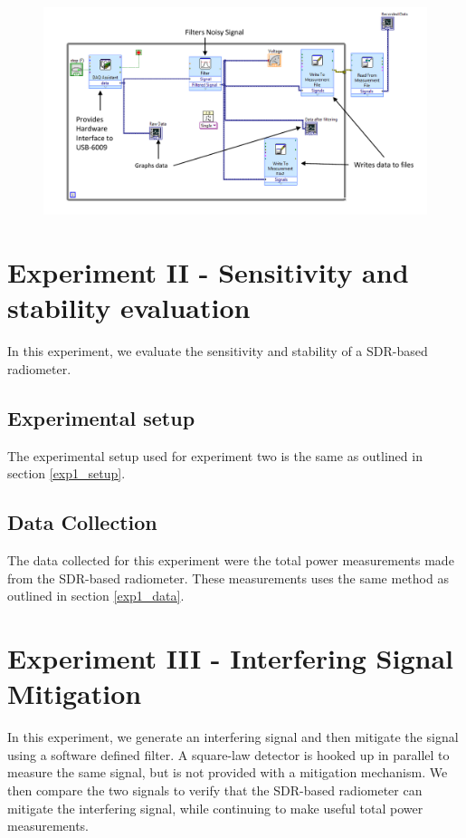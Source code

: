 {\begin{figure}[h!tb] \centering
\includegraphics[width=\textwidth]{Images/labview_diagram.pdf}
\label{labviewblock}
\end{figure}
}

\section{Experiment II - Sensitivity and stability evaluation}\label{Exp2}

In this experiment, we evaluate the sensitivity and stability of a SDR-based radiometer.    

\subsection{Experimental setup} \label{exp2_setup}
The experimental setup used for experiment two is the same as outlined in section \ref{exp1_setup}.  

\subsection{Data Collection}
The data collected for this experiment were the total power measurements made from the SDR-based radiometer.  These measurements uses the same method as outlined in section \ref{exp1_data}.

\section{Experiment III - Interfering Signal Mitigation}\label{Exp3}

In this experiment, we generate an interfering signal and then mitigate the signal using a software defined filter.  A square-law detector is hooked up in parallel to measure the same signal, but is not provided with a mitigation mechanism.  We then compare the two signals to verify that the SDR-based radiometer can mitigate the interfering signal, while continuing to make useful total power measurements.

